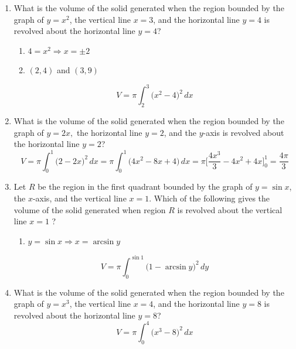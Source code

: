 \documentclass[12pt]{article}
\begin{document}
\begin{enumerate}
    \item What is the volume of the solid generated when the region bounded by the graph of $y=x^2$, the vertical line $x=3$, and the horizontal line $y=4$ is revolved about the horizontal line $y=4$?
    \begin{enumerate}
        \item $4=x^2 \Longrightarrow x=\pm 2$
        \item $(2,4)$ and $(3,9)$
    \end{enumerate}
    $$\boxed{V=\pi\int_{2}^{3} \big(x^2-4\big)^2 \, dx}$$

    \item What is the volume of the solid generated when the region bounded by the graph of $y=2x,$ the horizontal line $y=2$, and the $y$-axis is revolved about the horizontal line $y=2$?
    $$V=\pi\int_{0}^{1} \big(2-2x\big)^2 \, dx =\pi\int_{0}^{1} \big(4x^2-8x+4\big) \, dx=\pi\biggr[\frac{4x^3}{3}-4x^2+4x\biggr]_{0}^{1} = \boxed{\frac{4\pi}{3}}$$
   

    \item Let $R$ be the region in the first quadrant bounded by the graph of $y=\sin x$, the $x$-axis, and the vertical line $x=1$. Which of the following gives the volume of the solid generated when region $R$ is revolved about the vertical line $x=1$ ?
    \begin{enumerate}
        \item $y =\sin x \Longrightarrow x=\arcsin y$
    \end{enumerate}
    $$\boxed{V=\pi\int_{0}^{\sin 1} \big(1-\arcsin y\big)^2 \, dy}$$

    \item What is the volume of the solid generated when the region bounded by the graph of $y=x^3$, the vertical line $x=4$, and the horizontal line $y=8$ is revolved about the horizontal line $y=8$?
    $$\boxed{V=\pi \int_{0}^{4}\big(x^3-8\big)^2 \, dx}$$


\end{enumerate}
\end{document}
